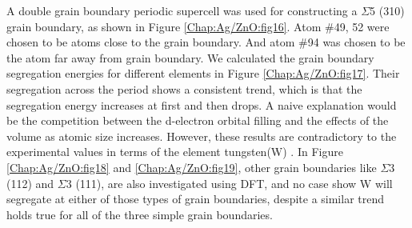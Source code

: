 A double grain boundary periodic supercell was used for constructing a $\Sigma$5 (310) grain boundary, as shown in Figure \ref{Chap:Ag/ZnO:fig16}. Atom \#49, 52 were chosen to be atoms close to the grain boundary. And atom \#94 was chosen to be the atom far away from grain boundary. We calculated the grain boundary segregation energies for different elements in Figure \ref{Chap:Ag/ZnO:fig17}. Their segregation across the period shows a consistent trend, which is that the segregation energy increases at first and then drops. A naive explanation would be the competition between the d-electron orbital filling and the effects of the volume as atomic size increases. However, these results are contradictory to the experimental values in terms of the element tungsten(W) \cite{chookajorn2012design,jiao2018nanocrystalline}. In Figure \ref{Chap:Ag/ZnO:fig18} and \ref{Chap:Ag/ZnO:fig19}, other grain boundaries like $\Sigma$3 (112) and $\Sigma$3 (111), are also investigated using \ac{DFT}, and no case show W will segregate at either of those types of grain boundaries, despite a similar trend holds true for all of the three simple grain boundaries.

